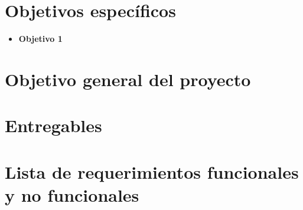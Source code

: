 \documentclass[12pt,twoside]{article}
\begin{document}
\section{Objetivos específicos}
\begin{itemize}
    \item \textbf{Objetivo 1}
\end{itemize}

\section{Objetivo general del proyecto}


\section{Entregables}


\section{Lista de requerimientos funcionales y no funcionales}
\end{document}
